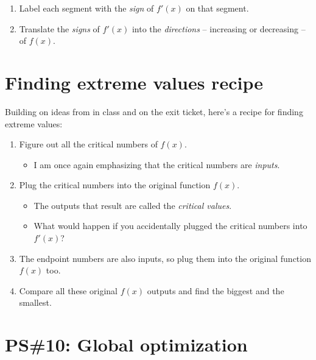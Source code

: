 \begin{enumerate}[leftmargin=15pt]
    \begin{itemize}
        \item We are making a number line about \textit{slopes}, so we plug into $f'(x)$, not $f(x)$.
        \item We low-key don't care what \textit{number} comes out of $f'(x)$; we really only care about its \textit{sign}: $+$ or $-$. (That's why this is called a \textit{sign} chart!)
    \end{itemize}
    \item Label each segment with the \textit{sign} of $f'(x)$ on that segment.
    \item Translate the \textit{signs} of $f'(x)$ into the \textit{directions} -- increasing or decreasing -- of $f(x)$.
\end{enumerate}
\hrulefill
\section{Finding extreme values recipe}
Building on ideas from in class and on the exit ticket, here's a recipe for finding extreme values:

\begin{enumerate}[leftmargin=15pt]
    \item Figure out all the critical numbers of $f(x)$. 
    \begin{itemize}
        \item I am once again emphasizing that the critical numbers are \textit{inputs}.
    \end{itemize}
    \item Plug the critical numbers into the original function $f(x)$.
    \begin{itemize}
        \item The outputs that result are called the \textit{critical values}.
        \item What would happen if you accidentally plugged the critical numbers into $f'(x)$? 
    \end{itemize} 
    \item The endpoint numbers are also inputs, so plug them into the original function $f(x)$ too.
    \item Compare all these original $f(x)$ outputs and find the biggest and the smallest.
\end{enumerate}


\pagebreak

\section{PS\#10: Global optimization}

